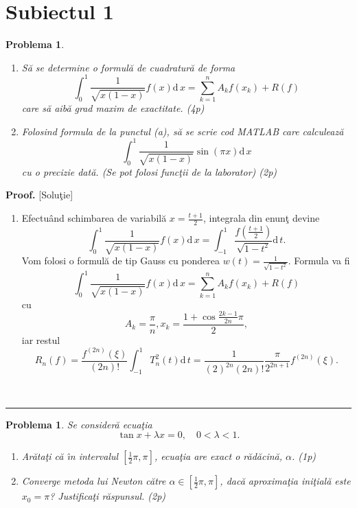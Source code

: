 \documentclass[12pt]{article}%
\newtheorem{problem}[theorem]{Problema}
\newenvironment{proof}[1][Proof]{\noindent\textbf{#1.} }{\ \rule{0.5em}{0.5em}}
\begin{document}
\section{Subiectul 1}

\begin{problem}
\begin{enumerate}
\item[(a)] S\u{a} se determine o formul\u{a} de cuadratur\u{a} de forma%
\[
\int_{0}^{1}\frac{1}{\sqrt{x(1-x)}}f(x)\mathrm{d}\,x=\sum_{k=1}^{n}%
A_{k}f(x_{k})+R(f)
\]
care s\u{a} aib\u{a} grad maxim de exactitate. (4p)

\item[(b)] Folosind formula de la punctul (a), s\u{a} se scrie cod MATLAB care
calculeaz\u{a}%
\[
\int_{0}^{1}\frac{1}{\sqrt{x(1-x)}}\sin(\pi x)\mathrm{d}\,x
\]
cu o precizie dat\u{a}. (Se pot folosi func\c{t}ii de la laborator) (2p)
\end{enumerate}
\end{problem}

\begin{proof}
[Solu\c{t}ie]

\begin{enumerate}
\item[(a)] Efectu\^{a}nd schimbarea de variabil\u{a} $x=\frac{t+1}{2}$,
integrala din enun\c{t} devine%
\[
\int_{0}^{1}\frac{1}{\sqrt{x(1-x)}}f(x)\mathrm{d}\,x=\int_{-1}^{1}%
\frac{f\left(  \frac{t+1}{2}\right)  }{\sqrt{1-t^{2}}}\mathrm{d}\,t\text{.}%
\]
Vom folosi o formul\u{a} de tip Gauss cu ponderea $w(t)=\frac{1}{\sqrt
{1-t^{2}}}$. Formula va fi
\[
\int_{0}^{1}\frac{1}{\sqrt{x(1-x)}}f(x)\mathrm{d}\,x=\sum_{k=1}^{n}%
A_{k}f(x_{k})+R(f)
\]
cu
\[
A_{k}=\frac{\pi}{n},x_{k}=\frac{1+\cos\frac{2k-1}{2n}\pi}{2},
\]
iar restul%
\[
R_{n}(f)=\frac{f^{(2n)}(\xi)}{(2n)!}\int_{-1}^{1}T_{n}^{2}(t)\mathrm{d}%
\,t=\frac{1}{(2)^{2n}(2n)!}\frac{\pi}{2^{2n+1}}f^{(2n)}(\xi).
\]

\end{enumerate}
\end{proof}

\begin{problem}
\label{Gautschip4.19}Se consider\u{a} ecua\c{t}ia
\[
\tan x+\lambda x=0,\quad0<\lambda<1.
\]


\begin{enumerate}
\item[(a)] Ar\u{a}ta\c{t}i c\u{a} \^{\i}n intervalul $\left[  \frac{1}{2}%
\pi,\pi\right]  $, ecua\c{t}ia are exact o r\u{a}d\u{a}cin\u{a}, $\alpha$. (1p)

\item[(b)] Converge metoda lui Newton c\u{a}tre $\alpha\in\left[  \frac{1}%
{2}\pi,\pi\right]  $, dac\u{a} aproxima\c{t}ia ini\c{t}ial\u{a} este
$x_{0}=\pi$? Justifica\c{t}i r\u{a}spunsul. (2p)
\end{enumerate}
\end{problem}
\end{document}
